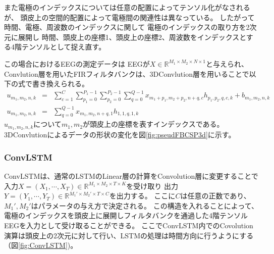 また電極のインデックスについては任意の配置によってテンソル化がなされるが、
頭皮上の空間的配置によって電極間の関連性は異なっている。
したがって時間、電極、周波数のインデックスに関して
電極のインデックスの取り方を2次元に展開し
時間、頭皮上の座標1、頭皮上の座標2、周波数をインデックスとする4階テンソルとして捉え直す。

この場合におけるEEGの測定データは
EEGが\(X\in \mathbb R^{M_1\times M_2\times N\times 1}\)と与えられ、
Convlution層を用いたFIRフィルタバンクは、3DConvlution層を用いることで以下の式で書き換えられる。
\begin{eqnarray}
    u_{m_1,m_2,n,k}& = &\sum_{c=1}^C\sum_{p_1=0}^{P_1-1}\sum_{p_2=0}^{P_2-1}\sum_{q=0}^{Q-1} x_{m_1+p_1,m_2+p_2,n+q,c} h_{p_1,p_2,q,c,k} + b_{m_1,m_2,n,k}\\
    u_{m_1,m_2,n,k}& = &\sum_{q=0}^{Q-1} x_{m_1,m_2,n+q,1} h_{1,1,q,1,k}
    \label{eq:pseudoFIR3D}
\end{eqnarray} 
\(u_{m_1,m_2,n,k}\)について\(m_1,m_2\)が頭皮上の座標を表すインデックスである。
3DConvlutionによるデータの形状の変化を図\ref{fig:pseudFBCSP3d}に示す。


\subsubsection{\rm ConvLSTM}
ConvLSTMは、通常のLSTMのLinear層の計算をConvolution層に変更することで
入力\(X = (X_1,\cdots,X_T)\in \mathbb R^{M_1 \times M_2 \times T \times K}\)を受け取り
出力\(Y = (Y_1,\cdots,Y_T)\in \mathbb R^{M_1' \times M_2' \times T \times C}\)を出力する。
ここに\(C\)は任意の正数であり、\(M_1',M_2'\)はパラメータの与え方で決定される。
この構造を入れることによって、
電極のインデックスを頭皮上に展開しフィルタバンクを通過した4階テンソルEEGを入力として受け取ることができる。
ここでConvLSTM内でのCovolution演算は頭皮上の2次元に対して行い、LSTMの処理は時間方向に行うようにする（図\ref{fig:ConvLSTM})。

